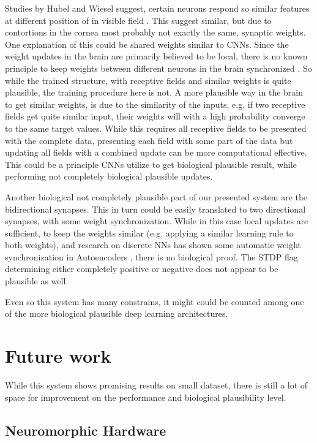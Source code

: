 Studies by Hubel and Wiesel suggest, certain neurons respond so similar features at different position of in visible field \cite{Hubel1959}.
This suggest similar, but due to contortions in the cornea most probably not exactly the same, synaptic weights. 
One explanation of this could be shared weights similar to CNNs. 
Since the weight updates in the brain are primarily believed to be local, there is no known principle to keep weights between different neurons in the brain synchronized \cite{DBLP:journals/corr/ScellierB16}.
So while the trained structure, with receptive fields and similar weights is quite plausible, the training procedure here is not.
A more plausible way in the brain to get similar weights, is due to the similarity of the inputs, e.g. if two receptive fields get quite similar input, their weights will with a high probability converge to the same target values.  
While this requires all receptive fields to be presented with the complete data, presenting each field with some part of the data but updating all fields with a combined update can be more computational effective. 
This could be a principle CNNs utilize to get biological plausible result, while performing not completely biological plausible updates.

Another biological not completely plausible part of our presented system are the bidirectional synapses.
This in turn could be easily translated to two directional synapses, with some weight synchronization. 
While in this case local updates are sufficient, to keep the weights similar (e.g. applying a similar learning rule to both weights), and research on discrete NNs has shown some automatic weight synchronization in Autoencoders \cite{vincent2010stacked}, there is no biological proof.
The STDP flag determining either completely positive or negative does not appear to be plausible as well.

Even so this system has many constrains, it might could be counted among one of the more biological plausible deep learning architectures.     

\section{Future work} \label{c:future}

While this system shows promising results on small dataset, there is still a lot of space for improvement on the performance and biological plausibility level.

\subsection{Neuromorphic Hardware} \label{c:neuhard}

